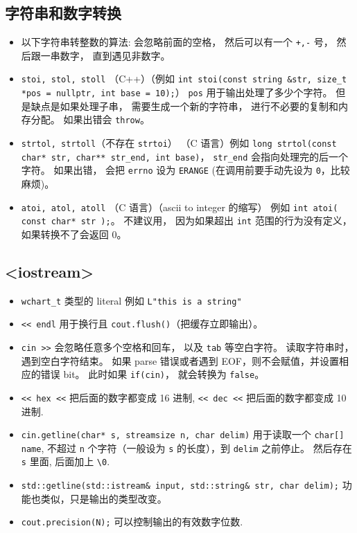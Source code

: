 \subsection{字符串和数字转换}
\begin{itemize}
\item 以下字符串转整数的算法: 会忽略前面的空格， 然后可以有一个 \verb|+,-| 号， 然后跟一串数字， 直到遇见非数字。
\item \verb|stoi, stol, stoll| （C++）（例如 \verb|int stoi(const string &str, size_t *pos = nullptr, int base = 10);|） \verb|pos| 用于输出处理了多少个字符。 但是缺点是如果处理子串， 需要生成一个新的字符串， 进行不必要的复制和内存分配。 如果出错会 \verb|throw|。
\item \verb|strtol, strtoll|（不存在 \verb|strtoi|） （C 语言）例如 \verb|long strtol(const char* str, char** str_end, int base)|， \verb|str_end| 会指向处理完的后一个字符。 如果出错， 会把 \verb|errno| 设为 \verb|ERANGE| (在调用前要手动先设为 \verb|0|，比较麻烦)。
\item \verb|atoi, atol, atoll| （C 语言）（ascii to integer 的缩写） 例如 \verb|int atoi( const char* str );|。 不建议用， 因为如果超出 \verb|int| 范围的行为没有定义， 如果转换不了会返回 0。
\end{itemize}

\subsection{<iostream>}
\begin{itemize}
\item \verb`wchart_t` 类型的 literal 例如 \verb`L"this is a string"`
\item \verb`<< endl` 用于换行且 \verb|cout.flush()|（把缓存立即输出）。
\item \verb|cin >>| 会忽略任意多个空格和回车， 以及 \verb|tab| 等空白字符。 读取字符串时，遇到空白字符结束。 如果 parse 错误或者遇到 EOF，则不会赋值，并设置相应的错误 bit。 此时如果 \verb|if(cin)|， 就会转换为 \verb|false|。
\item \verb`<< hex <<` 把后面的数字都变成 16 进制, \verb`<< dec <<` 把后面的数字都变成 10 进制.
\item \verb`cin.getline(char* s, streamsize n, char delim)` 用于读取一个 \verb`char[] name`, 不超过 \verb|n| 个字符（一般设为 \verb|s| 的长度），到 \verb|delim| 之前停止。 然后存在 \verb|s| 里面, 后面加上 \verb`\0`.
\item \verb|std::getline(std::istream& input, std::string& str, char delim);| 功能也类似，只是输出的类型改变。
\item \verb`cout.precision(N);` 可以控制输出的有效数字位数.
\end{itemize}

